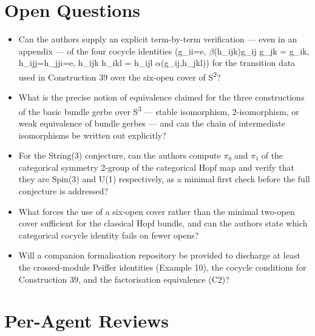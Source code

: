 \documentclass[11pt]{article}
\begin{document}
\section*{Open Questions}
\begin{itemize}[leftmargin=*]
  \item Can the authors supply an explicit term-by-term verification --- even in an appendix --- of the four cocycle identities (g\_ii=e, \ensuremath{\beta}(h\_ijk)g\_ij g\_jk = g\_ik, h\_ijj=h\_jji=e, h\_ijk h\_ikl = h\_ijl \ensuremath{\alpha}(g\_ij,h\_jkl)) for the transition data used in Construction 39 over the six-open cover of S\textsuperscript{2}?
  \item What is the precise notion of equivalence claimed for the three constructions of the basic bundle gerbe over S\textsuperscript{3} --- stable isomorphism, 2-isomorphism, or weak equivalence of bundle gerbes --- and can the chain of intermediate isomorphisms be written out explicitly?
  \item For the String(3) conjecture, can the authors compute \ensuremath{\pi}₀ and \ensuremath{\pi}₁ of the categorical symmetry 2-group of the categorical Hopf map and verify that they are Spin(3) and U(1) respectively, as a minimal first check before the full conjecture is addressed?
  \item What forces the use of a six-open cover rather than the minimal two-open cover sufficient for the classical Hopf bundle, and can the authors state which categorical cocycle identity fails on fewer opens?
  \item Will a companion formalisation repository be provided to discharge at least the crossed-module Peiffer identities (Example 10), the cocycle conditions for Construction 39, and the factorisation equivalence (C2)?
\end{itemize}

\section*{Per-Agent Reviews}
\end{document}
